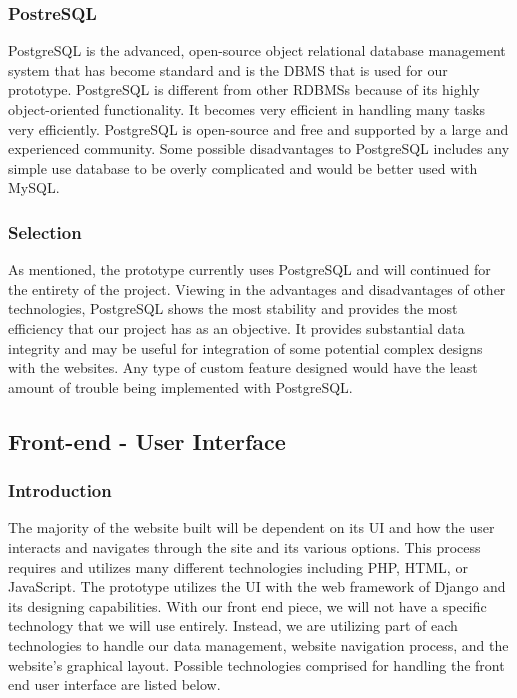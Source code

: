 \documentclass[draftclsnofoot,10pt,onecolumn]{IEEEtran} %
\begin{document}
\subsubsection{PostreSQL}
PostgreSQL is the advanced, open-source object relational database management system that has become standard and is the
DBMS that is used for our prototype. PostgreSQL is different from other RDBMSs because of its highly object-oriented
functionality. It becomes very efficient in handling many tasks very efficiently. PostgreSQL is open-source and free and
supported by a large and experienced community. Some possible disadvantages to PostgreSQL includes any simple use
database to be overly complicated and would be better used with MySQL. \\

\subsubsection{Selection}
As mentioned, the prototype currently uses PostgreSQL and will continued for the entirety of the project. Viewing in the
advantages and disadvantages of other technologies, PostgreSQL shows the most stability and provides the most efficiency
that our project has as an objective. It provides substantial data integrity and may be useful for integration of some potential
complex designs with the websites. Any type of custom feature designed would have the least amount of trouble being
implemented with PostgreSQL. \\

\subsection{Front-end - User Interface}

\subsubsection{Introduction}
The majority of the website built will be dependent on its UI and how the user interacts and navigates through the site and its
various options. This process requires and utilizes many different technologies including PHP, HTML, or JavaScript. The
prototype utilizes the UI with the web framework of Django and its designing capabilities. With our front end piece, we will
not have a specific technology that we will use entirely. Instead, we are utilizing part of each technologies to handle our data
management, website navigation process, and the website’s graphical layout. Possible technologies comprised for handling
the front end user interface are listed below. \\
\end{document}
